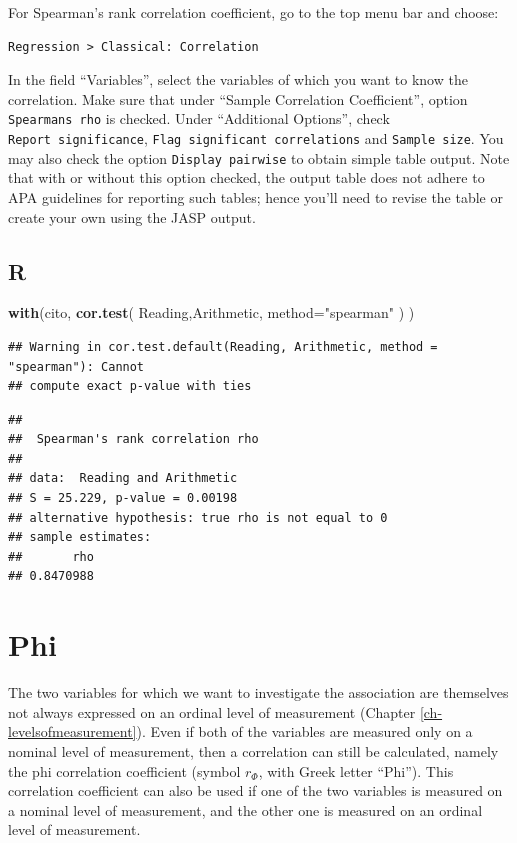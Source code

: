 \documentclass[
]{book}
\newenvironment{Shaded}{\begin{snugshade}}{\end{snugshade}}
\newcommand{\AttributeTok}[1]{\textcolor[rgb]{0.13,0.29,0.53}{#1}}
\newcommand{\FunctionTok}[1]{\textcolor[rgb]{0.13,0.29,0.53}{\textbf{#1}}}
\newcommand{\NormalTok}[1]{#1}
\newcommand{\StringTok}[1]{\textcolor[rgb]{0.31,0.60,0.02}{#1}}
\begin{document}
For Spearman's rank correlation coefficient, go to the top menu bar and choose:

\begin{verbatim}
Regression > Classical: Correlation
\end{verbatim}

In the field ``Variables'', select the variables of which you want to know the correlation.
Make sure that under ``Sample Correlation Coefficient'', option \texttt{Spearman\textquotesingle{}s\ rho} is checked.
Under ``Additional Options'', check \texttt{Report\ significance}, \texttt{Flag\ significant\ correlations} and \texttt{Sample\ size}. You may also check the option \texttt{Display\ pairwise} to obtain simple table output.
Note that with or without this option checked, the output table does not adhere to APA guidelines for reporting such tables; hence you'll need to revise the table or create your own using the JASP output.

\hypertarget{r-9}{%
\subsection{R}\label{r-9}}

\begin{Shaded}
\begin{Highlighting}[]
\FunctionTok{with}\NormalTok{(cito, }\FunctionTok{cor.test}\NormalTok{( Reading,Arithmetic, }\AttributeTok{method=}\StringTok{"spearman"}\NormalTok{ ) )}
\end{Highlighting}
\end{Shaded}

\begin{verbatim}
## Warning in cor.test.default(Reading, Arithmetic, method = "spearman"): Cannot
## compute exact p-value with ties
\end{verbatim}

\begin{verbatim}
## 
##  Spearman's rank correlation rho
## 
## data:  Reading and Arithmetic
## S = 25.229, p-value = 0.00198
## alternative hypothesis: true rho is not equal to 0
## sample estimates:
##       rho 
## 0.8470988
\end{verbatim}

\hypertarget{sec:Phi}{%
\section{Phi}\label{sec:Phi}}

The two variables for which we want to investigate the association are themselves
not always expressed on an ordinal level of measurement (Chapter \ref{ch-levelsofmeasurement}).
Even if both of the variables are measured only on a nominal level of measurement,
then a correlation can still be calculated, namely the phi correlation coefficient
(symbol \(r_\Phi\), with Greek letter ``Phi''). This correlation coefficient can also be used
if one of the two variables is measured on a nominal level of measurement,
and the other one is measured on an ordinal level of measurement.
\end{document}

